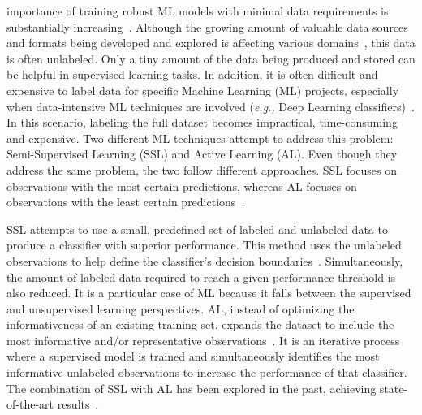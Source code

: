 \documentclass[10pt,journal,compsoc]{IEEEtran}
\begin{document}
\maketitle

\IEEEdisplaynontitleabstractindextext

%
\IEEEpeerreviewmaketitle




 importance of training robust ML models with minimal data
requirements is substantially increasing~\cite{Nath2021, Sverchkov2017,
Li2012}. Although the growing amount of valuable data sources and formats
being developed and explored is affecting various domains~\cite{Li2021}, this
data is often unlabeled. Only a tiny amount of the data being produced and
stored can be helpful in supervised learning tasks. In addition, it is often
difficult and expensive to label data for specific Machine Learning (ML)
projects, especially when data-intensive ML techniques are involved
(\textit{e.g.,} Deep Learning classifiers)~\cite{Nath2021}. In this scenario,
labeling the full dataset becomes impractical, time-consuming and expensive.
Two different ML techniques attempt to address this problem: Semi-Supervised
Learning (SSL) and Active Learning (AL). Even though they address the same
problem, the two follow different approaches. SSL focuses on observations with
the most certain predictions, whereas AL focuses on observations with the
least certain predictions~\cite{Simeoni2020}.

SSL attempts to use a small, predefined set of labeled and unlabeled data to
produce a classifier with superior performance. This method uses the unlabeled
observations to help define the classifier's decision
boundaries~\cite{Van2020}. Simultaneously, the amount of labeled data required
to reach a given performance threshold is also reduced. It is a particular
case of ML because it falls between the supervised and unsupervised learning
perspectives. AL, instead of optimizing the informativeness of an existing
training set, expands the dataset to include the most informative and/or
representative observations~\cite{Sener2018}. It is an iterative process where
a supervised model is trained and simultaneously identifies the most
informative unlabeled observations to increase the performance of that
classifier. The combination of SSL with AL has been explored in the past,
achieving state-of-the-art results~\cite{Leng2013}.
 
\end{document}
